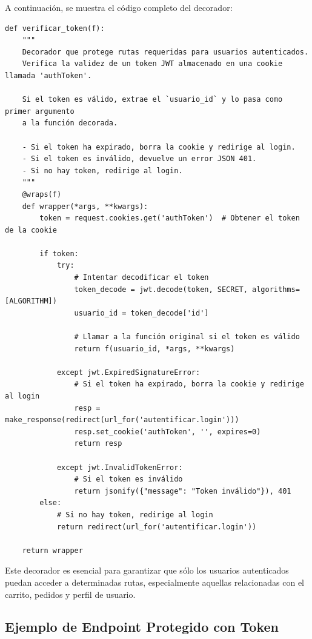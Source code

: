 \documentclass[10pt]{book}
\begin{document}
A continuación, se muestra el código completo del decorador:

\begin{lstlisting}[style=pythonclean, caption={Decorador verificar\_token}]
def verificar_token(f):
    """
    Decorador que protege rutas requeridas para usuarios autenticados.
    Verifica la validez de un token JWT almacenado en una cookie llamada 'authToken'.

    Si el token es válido, extrae el `usuario_id` y lo pasa como primer argumento
    a la función decorada.

    - Si el token ha expirado, borra la cookie y redirige al login.
    - Si el token es inválido, devuelve un error JSON 401.
    - Si no hay token, redirige al login.
    """
    @wraps(f)
    def wrapper(*args, **kwargs):
        token = request.cookies.get('authToken')  # Obtener el token de la cookie
        
        if token:
            try:
                # Intentar decodificar el token
                token_decode = jwt.decode(token, SECRET, algorithms=[ALGORITHM])
                usuario_id = token_decode['id']
                
                # Llamar a la función original si el token es válido
                return f(usuario_id, *args, **kwargs)
            
            except jwt.ExpiredSignatureError:
                # Si el token ha expirado, borra la cookie y redirige al login
                resp = make_response(redirect(url_for('autentificar.login')))
                resp.set_cookie('authToken', '', expires=0)
                return resp
            
            except jwt.InvalidTokenError:
                # Si el token es inválido
                return jsonify({"message": "Token inválido"}), 401
        else:
            # Si no hay token, redirige al login
            return redirect(url_for('autentificar.login'))
    
    return wrapper
\end{lstlisting}

Este decorador es esencial para garantizar que sólo los usuarios autenticados puedan acceder a determinadas rutas, especialmente aquellas relacionadas con el carrito, pedidos y perfil de usuario.

\subsection{Ejemplo de Endpoint Protegido con Token}
\end{document}
